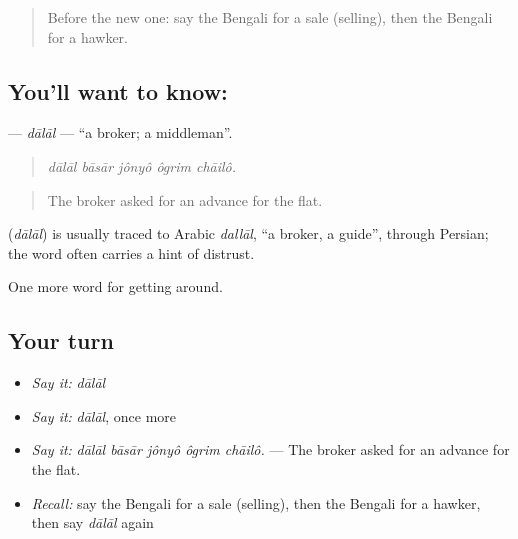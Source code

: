 \label{lesson:BN-C420-dalal}



\begin{quote}
Before the new one: say the Bengali for a sale (selling), then the Bengali for a hawker.
\end{quote}

\subsection*{You'll want to know: }
\textbf{} — \emph{dālāl} — \textquotedblleft{}a broker; a middleman\textquotedblright{}.

\begin{quote}
    
\end{quote}

\begin{quote}
\emph{dālāl bāsār jônyô ôgrim chāilô.}
\end{quote}

\begin{quote}
The broker asked for an advance for the flat.
\end{quote}

\begin{cousinweb}
\textbf{} (\emph{dālāl}) is usually traced to Arabic \emph{dallāl}, \textquotedblleft{}a broker, a guide\textquotedblright{}, through Persian; the word often carries a hint of distrust.
\end{cousinweb}

\begin{grammarlens}[title={What you've built}]
One more word for getting around.
\end{grammarlens}

\subsection*{Your turn}
\begin{itemize}
\raggedright
  \item \emph{Say it:} \emph{dālāl}
  \item \emph{Say it:} \emph{dālāl}, once more
  \item \emph{Say it:} \emph{dālāl bāsār jônyô ôgrim chāilô.} — The broker asked for an advance for the flat.
  \item \emph{Recall:} say the Bengali for a sale (selling), then the Bengali for a hawker, then say \emph{dālāl} again
\end{itemize}

